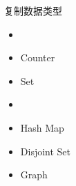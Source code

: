 \begin{frame}{}
  \begin{center}
    \begin{minipage}{0.50\textwidth}
      {\large 复制数据类型}  

      \vspace{0.20cm}
      \begin{itemize}
	\setlength{\itemsep}{4pt}
	\item {}
	\item Counter
	\item Set
	\item {}
	\item Hash Map
	\item Disjoint Set
	\item Graph
      \end{itemize}
    \end{minipage}
  \end{center}
\end{frame}

\begin{frame}{}
\end{frame}

% 
% 
